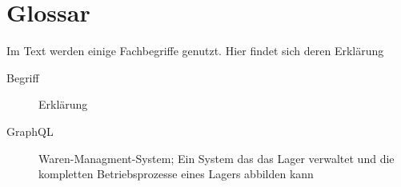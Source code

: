 \section{Glossar}

Im Text werden einige Fachbegriffe genutzt. Hier findet sich deren Erklärung

\begin{description}
    \item[Begriff] Erklärung
    \item[GraphQL] Waren-Managment-System; Ein System das das Lager verwaltet und die kompletten Betriebsprozesse eines Lagers abbilden kann
    \item[]
\end{description}


